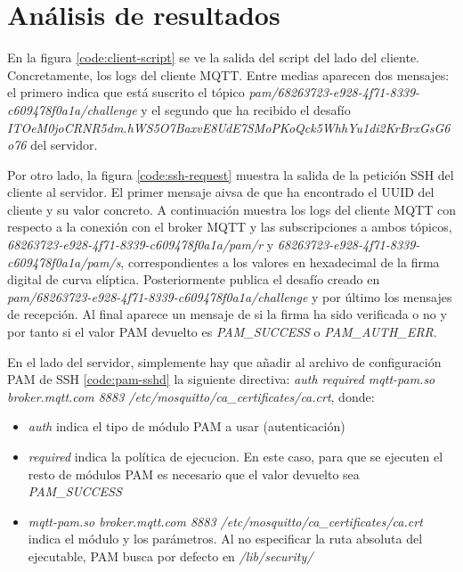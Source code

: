 \section{Análisis de resultados}

En la figura \ref{code:client-script} se ve la salida del script del lado del cliente. Concretamente, los logs del cliente MQTT. 
Entre medias aparecen dos mensajes: el primero indica que está suscrito el tópico \textit{pam/68263723-e928-4f71-8339-c609478f0a1a/challenge}
y el segundo que ha recibido el desafío \textit{ITOeM0joCRNR5dm.hWS5O7BaxvE8UdE7SMoPKoQck5WhhYu1di2KrBrxGsG6o76} del servidor.

Por otro lado, la figura \ref{code:ssh-request} muestra la salida de la petición SSH del cliente al servidor. El primer mensaje
aivsa de que ha encontrado el UUID del cliente y su valor concreto. A continuación muestra los logs del cliente MQTT con respecto 
a la conexión con el broker MQTT y las subscripciones a ambos tópicos, \textit{68263723-e928-4f71-8339-c609478f0a1a/pam/r} y 
\textit{68263723-e928-4f71-8339-c609478f0a1a/pam/s}, correspondientes a los valores en hexadecimal de la firma digital de 
curva elíptica. Posteriormente publica el desafío creado en \textit{pam/68263723-e928-4f71-8339-c609478f0a1a/challenge} y 
por último los mensajes de recepción. Al final aparece un mensaje de si la firma ha sido verificada o no y por tanto si el 
valor PAM devuelto es \textit{PAM\_SUCCESS} o \textit{PAM\_AUTH\_ERR}.  

En el lado del servidor, simplemente hay que añadir al archivo de configuración PAM de SSH \ref{code:pam-sshd} la siguiente 
directiva: \textit{auth required mqtt-pam.so broker.mqtt.com 8883 /etc/mosquitto/ca\_certificates/ca.crt}, donde:

\begin{itemize}
    \item \textit{auth} indica el tipo de módulo PAM a usar (autenticación)
    \item \textit{required} indica la política de ejecucion. En este caso, para que se ejecuten el resto de módulos PAM es 
    necesario que el valor devuelto sea \textit{PAM\_SUCCESS}
    \item \textit{mqtt-pam.so broker.mqtt.com 8883 /etc/mosquitto/ca\_certificates/ca.crt} indica el módulo y los parámetros. 
    Al no especificar la ruta absoluta del ejecutable, PAM busca por defecto en \textit{/lib/security/}
\end{itemize}


